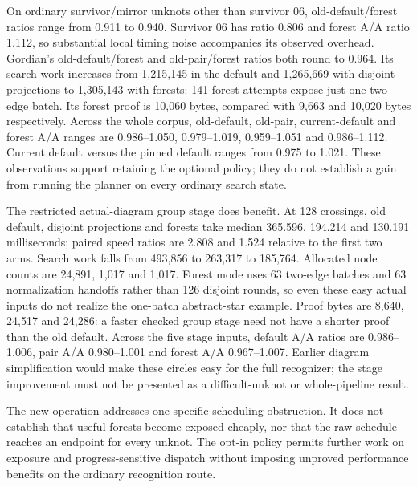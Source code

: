 On ordinary survivor/mirror unknots other than survivor 06, old-default/forest
ratios range from 0.911 to 0.940. Survivor 06 has ratio 0.806 and forest
A/A ratio 1.112, so substantial local timing noise accompanies its observed
overhead. Gordian's old-default/forest and old-pair/forest ratios both round
to 0.964. Its search work increases from 1,215,145 in the default and
1,265,669 with disjoint projections to 1,305,143 with forests: 141 forest
attempts expose just one two-edge batch. Its forest proof is 10,060 bytes,
compared with 9,663 and 10,020 bytes respectively. Across the whole corpus,
old-default, old-pair, current-default and forest A/A ranges are
0.986--1.050, 0.979--1.019, 0.959--1.051 and 0.986--1.112. Current default
versus the pinned default ranges from 0.975 to 1.021. These observations
support retaining the optional policy; they do not establish a gain from
running the planner on every ordinary search state.

The restricted actual-diagram group stage does benefit. At 128 crossings,
old default, disjoint projections and forests take median 365.596, 194.214
and 130.191 milliseconds; paired speed ratios are 2.808 and 1.524 relative
to the first two arms. Search work falls from 493,856 to 263,317 to 185,764.
Allocated node counts are 24,891, 1,017 and 1,017. Forest mode uses 63
two-edge batches and 63 normalization handoffs rather than 126 disjoint
rounds, so even these easy actual inputs do not realize the one-batch
abstract-star example. Proof bytes are 8,640, 24,517 and 24,286: a faster
checked group stage need not have a shorter proof than the old default. Across the
five stage inputs, default A/A ratios are 0.986--1.006, pair A/A
0.980--1.001 and forest A/A 0.967--1.007. Earlier diagram simplification
would make these circles easy for the full recognizer; the stage improvement
must not be presented as a difficult-unknot or whole-pipeline result.

The new operation addresses one specific scheduling obstruction. It does
not establish that useful forests become exposed cheaply, nor that the
raw schedule reaches an endpoint for every unknot. The opt-in policy permits
further work on exposure and progress-sensitive dispatch without imposing
unproved performance benefits on the ordinary recognition route.
